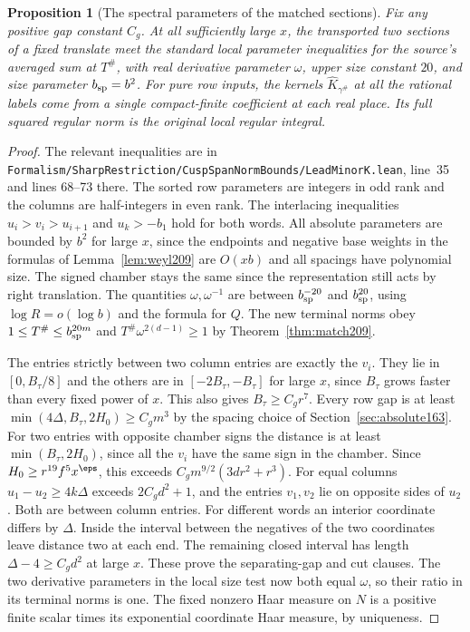 \documentclass[a4paper,11pt]{article}
\newtheorem{proposition}{Proposition}[section]
\theoremstyle{definition}
\theoremstyle{remark}
\newcommand{\srcloc}[2]{{\small\nolinkurl{#1.lean}}, line~#2}
\numberwithin{equation}{section}
\begin{document}
\begin{proposition}[The spectral parameters of the matched sections]
\label{prop:hyp209}
Fix any positive gap constant \(C_g\). At all sufficiently large
\(x\), the transported two sections of a fixed translate meet
the standard local parameter inequalities for the source's averaged
sum at \(T^\#\), with real derivative parameter \(\omega\), upper
size constant \(20\), and size parameter \(b_{\rm sp}=b^2\).
For pure row inputs, the kernels \(\widehat K_{\gamma^\#}\) at
all the rational labels come from a single compact-finite coefficient
at each real place. Its full squared regular norm is the original
local regular integral.
\end{proposition}
\begin{proof}
The relevant inequalities are in
\srcloc{Formalism/SharpRestriction/CuspSpanNormBounds/LeadMinorK}{35}
and lines 68--73 there. The sorted row parameters are integers
in odd rank and the columns are half-integers in even rank.
The interlacing inequalities \(u_i>v_i>u_{i+1}\) and \(u_k>-b_1\)
hold for both words. All absolute parameters are bounded by
\(b^2\) for large \(x\), since the endpoints and negative base
weights in the formulas of Lemma~\ref{lem:weyl209} are \(O(xb)\)
and all spacings have polynomial size. The signed chamber stays
the same since the representation still acts by right translation.
The quantities \(\omega,\omega^{-1}\) are between \(b_{\rm sp}^{-20}\)
and \(b_{\rm sp}^{20}\), using \(\log R=o(\log b)\) and the formula
for \(Q\). The new terminal norms obey
\(1\le T^\#\le b_{\rm sp}^{20m}\) and
\(T^\#\omega^{2(d-1)}\ge1\) by Theorem~\ref{thm:match209}.

The entries strictly between two column entries are exactly the
\(v_i\). They lie in \([0,B_\tau/8]\) and the others are in
\([-2B_\tau,-B_\tau]\) for large \(x\), since \(B_\tau\) grows
faster than every fixed power of \(x\). This also gives
\(B_\tau\ge C_g r^7\). Every row gap is at least
\(\min(4\Delta,B_\tau,2H_0)\ge C_g m^3\) by the spacing choice
of Section~\ref{sec:absolute163}. For two entries with opposite
chamber signs the distance is at least \(\min(B_\tau,2H_0)\), since
all the \(v_i\) have the same sign in the chamber. Since
\(H_0\ge r^{19} f^5 x^\eps\), this exceeds
\(C_g m^{9/2}(3dr^2+r^3)\).
For equal columns \(u_1-u_2\ge4k\Delta\) exceeds
\(2C_gd^2+1\), and the entries \(v_1,v_2\) lie on opposite
sides of \(u_2\). Both are between column entries.
For different words an interior coordinate differs by \(\Delta\).
Inside the interval between the negatives of the two coordinates
leave distance two at each end. The remaining closed interval has
length \(\Delta-4\ge C_gd^2\) at large \(x\). These prove the
separating-gap and cut clauses. The two derivative parameters in
the local size test now both equal \(\omega\), so their ratio
in its terminal norms is one. The fixed nonzero Haar measure
on \(N\) is a positive finite scalar times its exponential
coordinate Haar measure, by uniqueness.


\end{proof}
\end{document}
